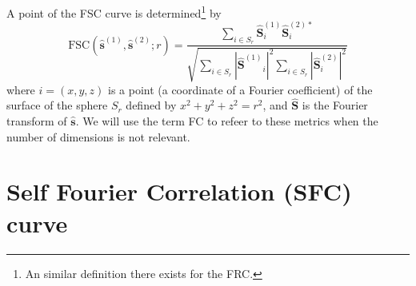 \begin{comment}
An advantage of correlation in the Fourier domain (FC\footnote{When
  the number of dimensions is not relevant, we will refer to this
  metric simply by FC (Fourier Correlation).}) over other similarity
metrics such as RMSE, SSIM or PPC is that FC values depend on the
frequency, and this can be interesting in some scenarios, such as
microscopy, where the resolution of the microscope is finite and known
a priori \cite{nieuwenhuizen2013measuring}. Notice that, with this
information, we can know whether the denoising is removing the
high-frequency components of the clean signal, or on the contrary,
basically noise.\footnote{When the SNR is very low, the Fourier
  coefficients of the same ring/shell of two different noisy versions
  of the same signal are uncorrelated and therefore, the corresponding
  curves values should be close to zero.}  For this reason, in some
fields such as single particle electron cryo-microscopy (cryo-EM),
\end{comment}

A point of the FSC curve is determined\footnote{An similar
  definition there exists for the FRC.} by~\cite{verbeke2024self}
\begin{equation}
  \text{FSC}(\hat{\mathbf{s}}^{(1)}, \hat{\mathbf{s}}^{(2)}; r) =
  \frac{\sum_{i \in S_r} \hat{\mathbf{S}}^{(1)}_i \hat{\mathbf{S}}^{(2)*}_i}
  {\sqrt{\sum_{i \in S_r} |{\hat{\mathbf{S}}^{(1)}}_i|^2 \sum_{i \in S_r} |{\hat{\mathbf{S}}^{(2)}_i}|^2}}
  \label{eq:FSC}
\end{equation}
where $i=(x, y, z)$ is a point (a coordinate of a Fourier coefficient)
of the surface of the sphere $S_r$ defined by $x^2+y^2+z^2=r^2$, and
$\hat{\mathbf{S}}$ is the Fourier transform of $\hat{\mathbf{s}}$. We
will use the term \gls{FC} to refeer to these metrics when the number
of dimensions is not relevant.


\section{Self Fourier Correlation (SFC) curve}

